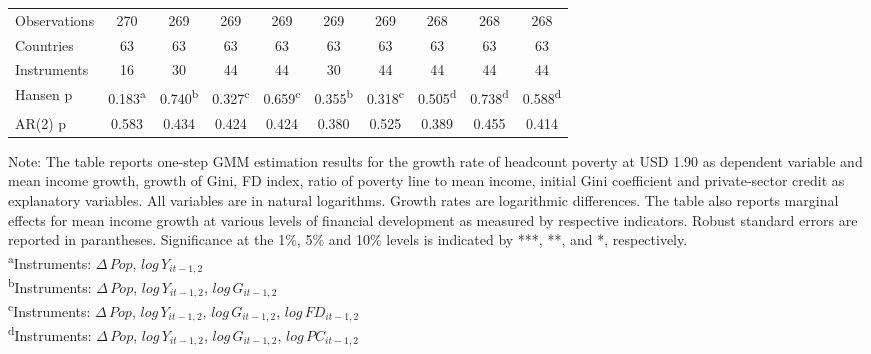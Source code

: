 \documentclass[12pt, a4paper]{article}
\begin{document}
\begin{appendices}
\begin{table}[htbp]
\begin{threeparttable}
{\begin{tabular}{l*{9}{c}}
				
				\hline
				Observations        &         270         &         269         &         269         &         269         &         269         &         269         &         268         &         268         &         268         \\
				Countries           &          63         &          63         &          63         &          63         &          63         &          63         &          63         &          63         &          63         \\
				Instruments         &          16         &          30         &          44         &          44         &          30         &          44         &          44         &          44         &          44         \\
				Hansen p         &       0.183\textsuperscript{a}         &       0.740\textsuperscript{b}         &       0.327\textsuperscript{c}         &       0.659\textsuperscript{c}         &       0.355\textsuperscript{b}         &       0.318\textsuperscript{c}         &       0.505\textsuperscript{d}         &       0.738\textsuperscript{d}         &       0.588\textsuperscript{d}         \\
				AR(2) p              &       0.583         &       0.434         &       0.424         &       0.424         &       0.380         &       0.525         &       0.389         &       0.455         &       0.414         \\
				\hline\hline
			\end{tabular}
		}
		\begin{tablenotes}
			\item \scriptsize{Note: The table reports one-step GMM estimation results for the growth rate of headcount poverty at USD 1.90 as dependent variable and mean income growth, growth of Gini, FD index, ratio of poverty line to mean income, initial Gini coefficient and private-sector credit as explanatory variables. All variables are in natural logarithms. Growth rates are logarithmic differences. The table also reports marginal effects for mean income growth at various levels of financial development as measured by respective indicators. Robust standard errors are reported in parantheses. Significance at the 1\%, 5\% and 10\% levels is indicated by ***, **, and *, respectively.\\
				\textsuperscript{a}Instruments: $\Delta \, Pop$, $log \, Y_{it-1,2}$}\\
			\textsuperscript{b}Instruments: $\Delta \, Pop$, $log \, Y_{it-1,2}$, $log \, G_{it-1,2}$\\
			\textsuperscript{c}Instruments: $\Delta \, Pop$, $log \, Y_{it-1,2}$, $log \, G_{it-1,2}$, $log \, FD_{it-1,2}$\\
			\textsuperscript{d}Instruments: $\Delta \, Pop$, $log \, Y_{it-1,2}$, $log \, G_{it-1,2}$, $log \, PC_{it-1,2}$\\
			

\end{tablenotes}
\end{threeparttable}
\end{table}
\end{appendices}
\end{document}
